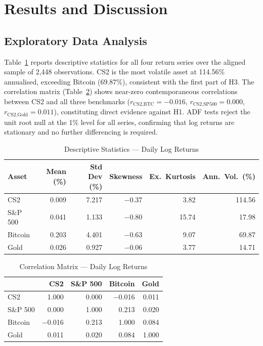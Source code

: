 \section{Results and Discussion}
\label{sec:results}

\subsection{Exploratory Data Analysis}

Table~\ref{tab:desc_stats} reports descriptive statistics for all four return
series over the aligned sample of 2,448 observations. CS2 is the most volatile
asset at 114.56\% annualised, exceeding Bitcoin (69.87\%), consistent with the
first part of H3. The correlation matrix (Table~\ref{tab:correlation}) shows
near-zero contemporaneous correlations between CS2 and all three benchmarks
($r_{\text{CS2,BTC}} = {-}0.016$, $r_{\text{CS2,SP500}} = 0.000$,
$r_{\text{CS2,Gold}} = 0.011$), constituting direct evidence against H1. ADF
tests reject the unit root null at the 1\% level for all series, confirming
that log returns are stationary and no further differencing is required.

\begin{table}[H]
\centering
\caption{Descriptive Statistics --- Daily Log Returns}
\label{tab:desc_stats}
\begin{tabular}{lrrrrr}
\hline
Asset    & Mean (\%) & Std Dev (\%) & Skewness & Ex.\ Kurtosis & Ann.\ Vol.\ (\%) \\
\hline
CS2      & 0.009 & 7.217 & $-$0.37 &  3.82 & 114.56 \\
S\&P 500 & 0.041 & 1.133 & $-$0.80 & 15.74 &  17.98 \\
Bitcoin  & 0.203 & 4.401 & $-$0.63 &  9.07 &  69.87 \\
Gold     & 0.026 & 0.927 & $-$0.06 &  3.77 &  14.71 \\
\hline
\end{tabular}
\end{table}

\begin{table}[H]
\centering
\caption{Correlation Matrix --- Daily Log Returns}
\label{tab:correlation}
\begin{tabular}{lrrrr}
\hline
         & CS2      & S\&P 500 & Bitcoin  & Gold  \\
\hline
CS2      &  1.000   &  0.000   & $-$0.016 & 0.011 \\
S\&P 500 &  0.000   &  1.000   &  0.213   & 0.020 \\
Bitcoin  & $-$0.016 &  0.213   &  1.000   & 0.084 \\
Gold     &  0.011   &  0.020   &  0.084   & 1.000 \\
\hline
\end{tabular}
\end{table}

